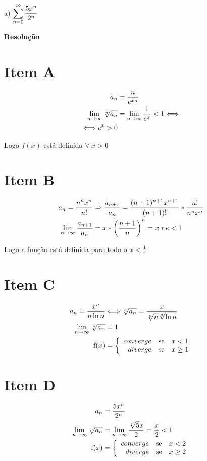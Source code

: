 \documentclass[12pt,openany, letterpaper]{book}
\newcommand{\LI}[1][n]{\lim_{{#1} \rightarrow \infty}}
\newcommand{\soma}[2][n]{\sum_{{#1} = #2}^\infty}
\newcommand{\Resolve}{\begin{center} \textbf{Resolução} \end{center}}
\newcommand{\IT}[1]{Item {#1}}
\begin{document}
{{\begin{multicols}{4}
a) $\displaystyle{\soma{0} {5x^n \over 2^n}}$
\end{multicols}

\Resolve

\begin{multicols}{2}
\section*{\IT{A}}\begin{align*}
a_n &= {n \over e^{xn}} \\
\LI \sqrt[n]{a_n} &= \LI {1 \over e^x} < 1 \Longleftrightarrow\\
\Longleftrightarrow e^x > 0
\end{align*}

Logo $f(x)$ está definida $\forall \ x > 0$

\section*{\IT{B}}\begin{align*}
a_n = {n^n x^n \over n!} &\Rightarrow {a_{n+1} \over a_n} = {(n+1)^{n+1} x^{n+1} \over (n+1)!}*{n! \over n^n x^n}\\
\LI {a_{n+1} \over a_n} &= x*\left({n+1 \over n}\right)^n = x*e < 1
\end{align*}

Logo a função está definida para todo o $\displaystyle{x < \frac{1}{e}}$

\section*{\IT{C}}\begin{align*}
a_n = {x^n \over n \ln{n}} &\Longleftrightarrow \sqrt[n]{a_n} = { x \over \sqrt[n]{n} \sqrt[n]{\ln{n}}}\\
\LI \sqrt[n]{a_n} &= 1 \\
\hbox{f}(x)
&= \left\{ \begin{array}{rll}
converge & \hbox{se} &  x < 1 \\
diverge & \hbox{se} &  x \geq 1 \\
\end{array}\right.
\end{align*}

\section*{\IT{D}}\begin{align*}
a_n &= {5x^n \over 2^n} \\
\LI \sqrt[n]{a_n} &= \LI {\sqrt[n]{5} x \over 2} = {x \over 2} < 1 \\
\hbox{f}(x)
&= \left\{ \begin{array}{rll}
converge & \hbox{se} &  x < 2 \\
diverge & \hbox{se} &  x \geq 2 \\
\end{array}\right.
\end{align*}


\end{multicols}}}
\end{document}
